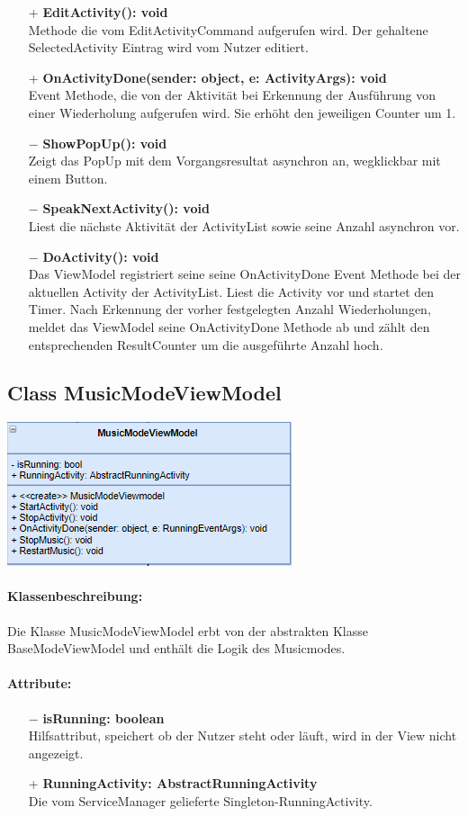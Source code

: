 \documentclass[a4paper,12pt]{article}
\begin{document}
\begin{itemize}
	\item[+] \textbf{EditActivity(): void} \\ Methode die vom EditActivityCommand aufgerufen wird. Der gehaltene SelectedActivity Eintrag wird vom Nutzer editiert.
	\item[+] \textbf{ OnActivityDone(sender: object, e: ActivityArgs): void} \\ Event Methode, die von der Aktivität bei Erkennung der Ausführung von einer Wiederholung aufgerufen wird. Sie erhöht den jeweiligen Counter um 1.  
	\item[$-$] \textbf{ShowPopUp(): void} \\ Zeigt das PopUp mit dem Vorgangsresultat asynchron an, wegklickbar mit einem Button. 
	\item[$-$] \textbf{SpeakNextActivity(): void} \\ Liest die nächste Aktivität der ActivityList sowie seine Anzahl asynchron vor. 
	\item[$-$] \textbf{DoActivity(): void} \\ Das ViewModel registriert seine seine OnActivityDone Event Methode bei der aktuellen Activity der ActivityList. Liest die Activity vor und startet den Timer. Nach Erkennung der vorher festgelegten Anzahl Wiederholungen, meldet das ViewModel seine OnActivityDone Methode ab und zählt den entsprechenden ResultCounter um die ausgeführte Anzahl hoch. \\
\end{itemize}


	\subsection{Class MusicModeViewModel}
	\includegraphics{bilder/ViewModelKlassen/MusicModeViewModel}
\paragraph{Klassenbeschreibung:}
Die Klasse MusicModeViewModel erbt von der abstrakten Klasse BaseModeViewModel und enthält die Logik des Musicmodes.
\paragraph{Attribute:}
\begin{itemize}
	\item[$-$] \textbf{isRunning: boolean} \\ Hilfsattribut, speichert ob der Nutzer steht oder läuft, wird in der View nicht angezeigt.
	\item[+] \textbf{RunningActivity: AbstractRunningActivity} \\ Die vom ServiceManager gelieferte Singleton-RunningActivity.
\end{itemize}
\end{document}
